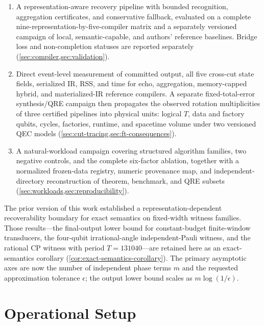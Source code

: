 \documentclass[a4paper,twocolumn,10pt,unpublished]{quantumarticle}
\begin{document}
\begin{enumerate}[leftmargin=1.5em]
    and the buffered control, which pays zero, is what fixes
    the boundary between the two regimes
    (\cref{def:self-identifying,prop:commitment-toll,fig:commit-toll}).
    \item A representation-aware recovery pipeline with bounded recognition,
    aggregation certificates, and conservative fallback, evaluated on a
    complete nine-representation-by-five-compiler matrix and a separately
    versioned campaign of local, semantic-capable, and authors' reference
    baselines.  Bridge loss and non-completion statuses are reported separately
    (\cref{sec:compiler,sec:validation}).
    \item Direct event-level measurement of committed output, all five
    cross-cut state fields, serialized IR, RSS, and time for echo, aggregation,
    memory-capped hybrid, and materialized-IR reference compilers.
    A separate fixed-total-error synthesis/QRE campaign then propagates
    the observed rotation multiplicities of three certified pipelines
    into physical units: logical $T$, data and factory qubits, cycles, factories,
    runtime, and spacetime volume under two
    versioned QEC models (\cref{sec:cut-tracing,sec:ft-consequences}).
    \item A natural-workload campaign covering structured algorithm families,
    two negative controls, and the complete six-factor ablation, together with
    a normalized frozen-data registry, numeric provenance map, and
    independent-directory reconstruction of theorem, benchmark, and QRE
    subsets (\cref{sec:workloads,sec:reproducibility}).
\end{enumerate}

The prior version of this work established a
representation-dependent recoverability boundary for exact semantics on
fixed-width witness families. Those results---the final-output lower
bound for constant-budget finite-window transducers, the four-qubit
irrational-angle independent-Pauli witness, and the rational CP witness
with period $T=131040$---are retained here as an exact-semantics
corollary (\cref{cor:exact-semantics-corollary}). The primary asymptotic
axes are now the number of independent phase terms $m$ and the requested
approximation tolerance $\epsilon$; the output lower bound scales as
$m\log(1/\epsilon)$.


\section{Operational Setup}
\label{sec:setup}
\end{document}
